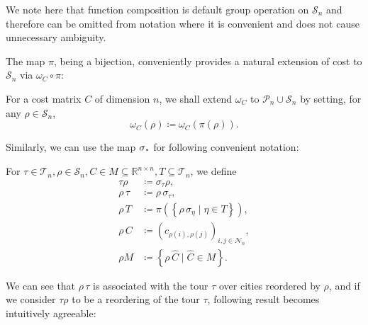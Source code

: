 \documentclass[index=totoc,bibliography=totoc]{scrartcl}
\newcommand*{\Cdot}{\raisebox{-0.30ex}{\scalebox{1.5}{$\cdot$}}}
\numberwithin{equation}{section}
\numberwithin{figure}{section}
\numberwithin{table}{section}
\begin{document}
\begin{remark}
  We note here that function composition is default group operation on
  $\mathcal{S}_n$ and therefore can be omitted from notation where it is
  convenient and does not cause unnecessary ambiguity.
\end{remark}

The map $\pi$, being a bijection, conveniently provides a natural extension
of cost to $\mathcal{S}_n$ via $\omega_C \circ \pi$:
\begin{define}
  For a cost matrix $C$ of dimension $n$,
  we shall extend $\omega_C$ to $\mathcal{P}_n \cup \mathcal{S}_n$
  by setting, for any $\rho \in \mathcal{S}_n$,
  \[
    \omega_C\left(\rho\right) \coloneqq \omega_C\left(\pi\left(\rho\right)\right).
  \]
\end{define}

Similarly, we can use the map $\sigma_{\Cdot}$ for following convenient notation:
\begin{define}
\label{def:actions}
  For $\tau \in \mathcal{T}_n, \rho \in \mathcal{S}_n,
       C \in M \subseteq \mathbb{R}^{n \times n}, T \subseteq \mathcal{T}_n$,
  we define
  \begin{align*}
    \tau \rho & \coloneqq \sigma_\tau \rho, \\
    \rho \, \tau & \coloneqq \rho \, \sigma_\tau, \\
    \rho \, T & \coloneqq \pi\left(\left\{ \rho \, \sigma_\eta \mid \eta \in T \right\}\right), \\
    \rho \, C & \coloneqq \left(c_{\rho\left(i\right),\rho\left(j\right)}\right)_{i,j \in \mathcal{N}_n}, \\
    \rho M & \coloneqq \left\{ \rho \, \widehat{C} \mid \widehat{C} \in M \right\}.
  \end{align*}
\end{define}

We can see that $\rho \, \tau$ is associated with the tour $\tau$ over
cities reordered by $\rho$, and if we consider $\tau \rho$ to be a
reordering of the tour $\tau$, following result becomes intuitively
agreeable:
\end{document}
